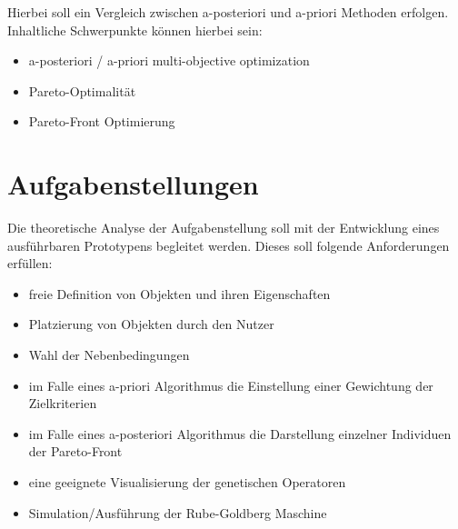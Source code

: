 \documentclass{article}
\begin{document}
Hierbei soll ein Vergleich zwischen a-posteriori und a-priori Methoden erfolgen.
Inhaltliche Schwerpunkte können hierbei sein:
\begin{itemize}
	\item a-posteriori / a-priori multi-objective optimization
	\item Pareto-Optimalität
	\item Pareto-Front Optimierung
\end{itemize}


\section{Aufgabenstellungen}
Die theoretische Analyse der Aufgabenstellung soll mit der Entwicklung eines ausführbaren Prototypens begleitet werden.
Dieses soll folgende Anforderungen erfüllen:

\begin{itemize}
	\item freie Definition von Objekten und ihren Eigenschaften
	\item Platzierung von Objekten durch den Nutzer
	\item Wahl der Nebenbedingungen
	\item im Falle eines a-priori Algorithmus die Einstellung einer Gewichtung der Zielkriterien
	\item im Falle eines a-posteriori Algorithmus die Darstellung einzelner Individuen der Pareto-Front
	\item eine geeignete Visualisierung der genetischen Operatoren
	\item Simulation/Ausführung der Rube-Goldberg Maschine
\end{itemize}

\vfill
\end{document}
